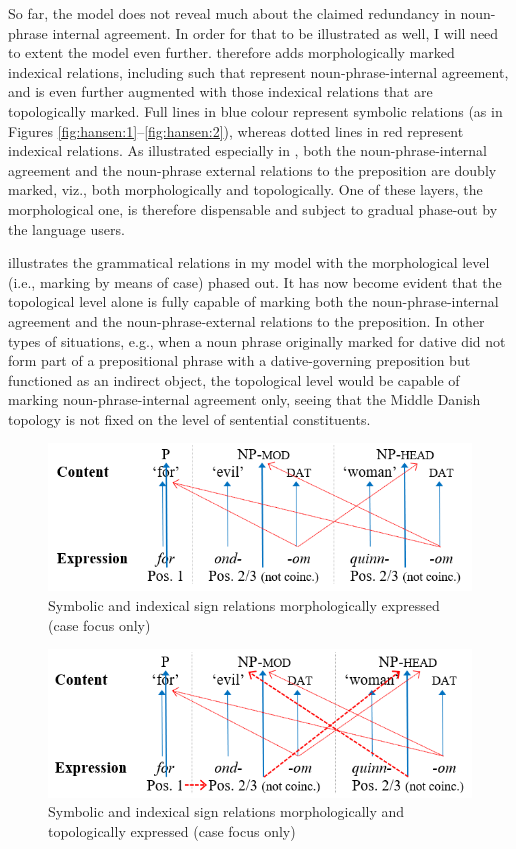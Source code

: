 \documentclass[output=paper]{langsci/langscibook}
\begin{document}
So far, the model does not reveal much about the claimed redundancy in noun-phrase internal agreement. In order for that to be illustrated as well, I will need to extent the model even further.  therefore adds morphologically marked indexical relations, including such that represent noun-phrase-internal agreement, and  is even further augmented with those indexical relations that are topologically marked. Full lines in blue colour represent symbolic relations (as in Figures \ref{fig:hansen:1}--\ref{fig:hansen:2}), whereas dotted lines in red represent indexical relations. As illustrated especially in , both the noun-phrase-internal agreement and the noun-phrase external relations to the preposition are doubly marked, viz., both morphologically and topologically. One of these layers, the morphological one, is therefore dispensable and subject to gradual phase-out by the language users.


 illustrates the grammatical relations in my model with the morphological level (i.e., marking by means of case) phased out. It has now become evident that the topological level alone is fully capable of marking both the noun-phrase-internal agreement and the noun-phrase-external relations to the preposition. In other types of situations, e.g., when a noun phrase originally marked for dative did not form part of a prepositional phrase with a dative-governing preposition but functioned as an indirect object, the topological level would be capable of marking noun-phrase-internal agreement only, seeing that the Middle Danish topology is not fixed on the level of sentential constituents.


\begin{figure}
	\caption{Symbolic and indexical sign relations morphologically expressed (case focus only)\label{fig:hansen:3}}
	\includegraphics[width=.75\textwidth]{figures/Hansen-fig3.png}
\end{figure}


\begin{figure}
	\caption{Symbolic and indexical sign relations morphologically and topologically expressed (case focus only)\label{fig:hansen:4}}
	\includegraphics[width=.75\textwidth]{figures/Hansen-fig4.png}
\end{figure}
\end{document}
